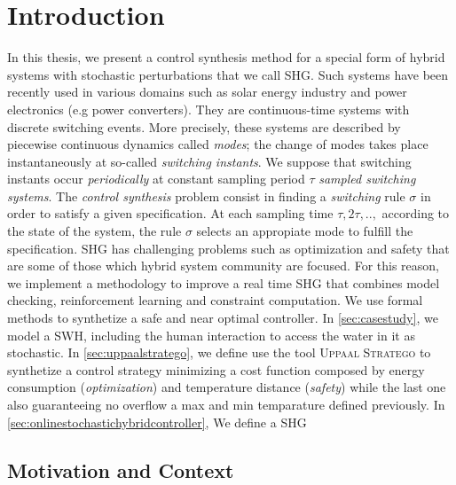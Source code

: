     \chapter{Introduction}
    
    \label{ch:intro}
    In this thesis, we present a control synthesis method for a special 
    form of hybrid systems with stochastic perturbations that we call
     \ac{SHG}. Such systems have been 
    recently used in various domains such as solar energy industry and power 
    electronics (e.g power converters). They are continuous-time systems
    with discrete switching events. More precisely, these systems are 
    described by piecewise continuous dynamics called \emph{modes}; the 
    change of modes takes place instantaneously at so-called \emph{switching
    instants}. We suppose that switching instants occur \emph{periodically}
    at constant sampling period $\tau$ \emph{sampled switching systems}.
    The \emph{control synthesis} problem consist in finding a \emph{switching}
    rule $\sigma$ in order to satisfy a given specification. At each sampling
    time $\tau, 2\tau,..,$ according to the state of the system, the rule 
    $\sigma$ selects an appropiate mode to fulfill the specification.
    \ac{SHG} has challenging problems such as optimization and safety that
    are some of those which hybrid system community are focused. For this reason,
    we implement a methodology to improve a real time \ac{SHG} that combines
    model checking, reinforcement learning and constraint computation. We 
    use formal methods to synthetize a safe and near optimal controller. 
    In \autoref{sec:casestudy}, we model a \ac{SWH}, including 
    the human interaction to access the water 
    in it as stochastic. In \autoref{sec:uppaalstratego}, we define 
    use the tool \textsc{Uppaal Stratego} to synthetize
    a control strategy minimizing a cost function composed by energy consumption
    (\emph{optimization}) and temperature distance (\emph{safety}) while the last
    one also guaranteeing no overflow a max and min temparature defined previously.
    In \autoref{sec:onlinestochastichybridcontroller}, We define a \ac{SHG}
    

    \section{Motivation and Context}
    \label{sec:motivation}


